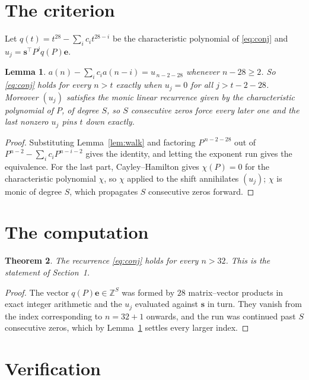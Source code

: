 \documentclass[11pt,a4paper]{article}
\theoremstyle{plain}
\newtheorem{theorem}{Theorem}
\newtheorem{lemma}[theorem]{Lemma}
\theoremstyle{definition}
\begin{document}
\section{The criterion}

Let $q(t)=t^{28}-\sum_i c_i t^{28-i}$ be the characteristic polynomial of
\eqref{eq:conj} and $u_j=\mathbf{s}^{\!\top}P^{j}q(P)\mathbf{e}$.

\begin{lemma}\label{lem:crit}
$a(n)-\sum_i c_i a(n-i)=u_{\,n-2-28}$ whenever $n-28\ge2$. So \eqref{eq:conj}
holds for every $n>t$ exactly when $u_j=0$ for all $j>t-2-28$. Moreover $(u_j)$
satisfies the monic linear recurrence given by the characteristic polynomial of $P$, of
degree $S$, so $S$ consecutive zeros force every later one and the last nonzero $u_j$ pins
$t$ down exactly.
\end{lemma}

\begin{proof}
Substituting Lemma~\ref{lem:walk} and factoring $P^{\,n-2-28}$ out of
$P^{n-2}-\sum_i c_i P^{n-i-2}$ gives the identity, and letting the exponent run gives the
equivalence. For the last part, Cayley--Hamilton gives $\chi(P)=0$ for the characteristic
polynomial $\chi$, so $\chi$ applied to the shift annihilates $(u_j)$; $\chi$ is monic of
degree $S$, which propagates $S$ consecutive zeros forward.
\end{proof}

\section{The computation}

\begin{theorem}
The recurrence \eqref{eq:conj} holds for every $n>32$. This is the statement of
Section~1.
\end{theorem}

\begin{proof}
The vector $q(P)\mathbf{e}\in\mathbb{Z}^{S}$ was formed by $28$ matrix--vector
products in exact integer arithmetic and the $u_j$ evaluated against $\mathbf{s}$ in turn.
They vanish from the index corresponding to $n=32+1$ onwards, and the run was continued
past $S$ consecutive zeros, which by Lemma~\ref{lem:crit} settles every larger index.
\end{proof}

\section{Verification}
\end{document}
